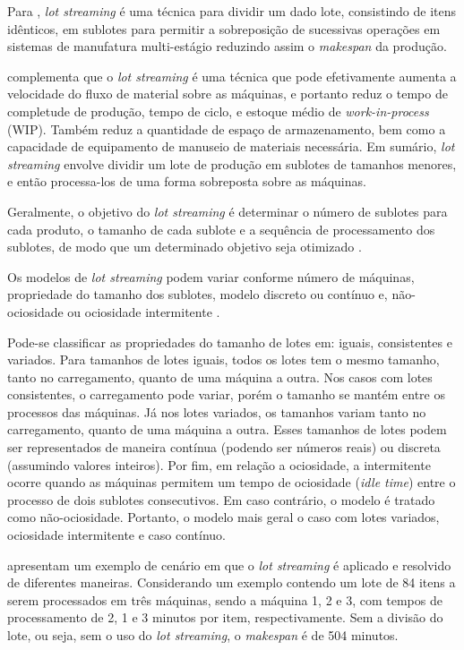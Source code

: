         Para , \textit{lot streaming} é uma técnica para dividir um dado lote, consistindo de itens idênticos, em sublotes para permitir a sobreposição de sucessivas operações em sistemas de manufatura multi-estágio reduzindo assim o \textit{makespan} da produção.
        
         complementa que o \textit{lot streaming} é uma técnica que pode efetivamente aumenta a velocidade do fluxo de material sobre as máquinas, e portanto reduz o tempo de completude de produção, tempo de ciclo, e estoque médio de \textit{work-in-process} (WIP). Também reduz a quantidade de espaço de armazenamento, bem como a capacidade de equipamento de manuseio de materiais necessária. Em sumário, \textit{lot streaming} envolve dividir um lote de produção em sublotes de tamanhos menores, e então processa-los de uma forma sobreposta sobre as máquinas.
        
        Geralmente, o objetivo do \textit{lot streaming} é determinar o número de sublotes para cada produto, o tamanho de cada sublote e a sequência de processamento dos sublotes, de modo que um determinado objetivo seja otimizado \cite{Mortezaei2013}.
        
        Os modelos de \textit{lot streaming} podem variar conforme número de máquinas, propriedade do tamanho dos sublotes, modelo discreto ou contínuo e, não-ociosidade ou ociosidade intermitente \cite{Trietsch1993, Mortezaei2014, Bozek2017}. 
        
        Pode-se classificar as propriedades do tamanho de lotes em: iguais, consistentes e variados. Para tamanhos de lotes iguais, todos os lotes tem o mesmo tamanho, tanto no carregamento, quanto de uma máquina a outra. Nos casos com lotes consistentes, o carregamento pode variar, porém o tamanho se mantém entre os processos das máquinas. Já nos lotes variados, os tamanhos variam tanto no carregamento, quanto de uma máquina a outra. Esses tamanhos de lotes podem ser representados de maneira contínua (podendo ser números reais) ou discreta (assumindo valores inteiros). Por fim, em relação a ociosidade, a intermitente ocorre quando as máquinas permitem um tempo de ociosidade (\textit{idle time}) entre o processo de dois sublotes consecutivos. Em caso contrário, o modelo é tratado como não-ociosidade. Portanto, o modelo mais geral o caso com lotes variados, ociosidade intermitente e caso contínuo.
        
         apresentam um exemplo de cenário em que o \textit{lot streaming} é aplicado e resolvido de diferentes maneiras. Considerando um exemplo contendo um lote de 84 itens a serem processados em três máquinas, sendo a máquina 1, 2 e 3, com tempos de processamento de 2, 1 e 3 minutos por item, respectivamente. Sem a divisão do lote, ou seja, sem o uso do \textit{lot streaming}, o \textit{makespan} é de 504 minutos. 

